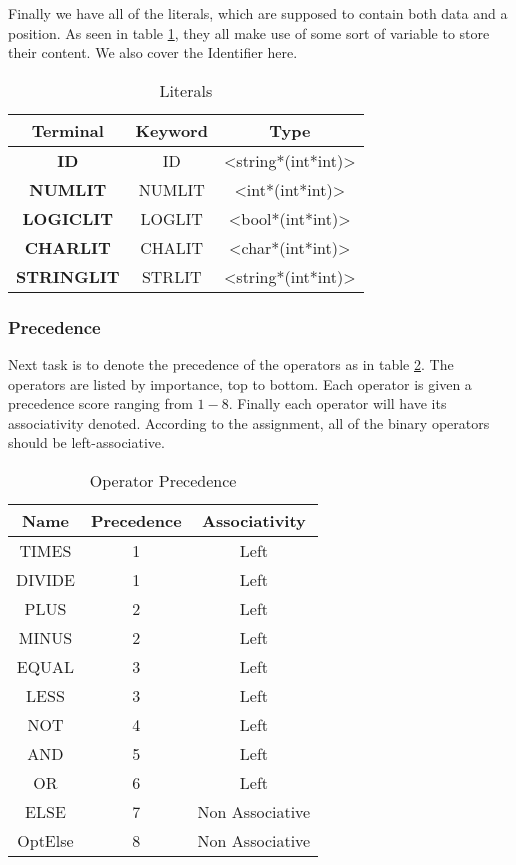 \documentclass[10pt]{article}
\begin{document}
Finally we have all of the literals, which are supposed to contain both data and a position. As seen in table \ref{tab:literals}, they all make use of some sort of variable to store their content. We also cover the Identifier here.

\begin{table}[!h]
\centering
\begin{tabular}{|c|c|c|}
\hline
Terminal & Keyword & Type\\
\hline
\textbf{ID} & ID & <string*(int*int)>\\
\textbf{NUMLIT} & NUMLIT & <int*(int*int)>\\
\textbf{LOGICLIT} & LOGLIT & <bool*(int*int)> \\
\textbf{CHARLIT} & CHALIT & <char*(int*int)> \\
\textbf{STRINGLIT} & STRLIT & <string*(int*int)> \\
\hline
\end{tabular}
\caption{\label{tab:literals}Literals}
\end{table}

\subsubsection{Precedence}
Next task is to denote the precedence of the operators as in table \ref{tab:op_precedence}. The operators are listed by importance, top to bottom. Each operator is given a precedence score ranging from \(1-8\). Finally each operator will have its associativity denoted. According to the assignment, all of the binary operators should be left-associative.

\begin{table}
\begin{center}
\begin{tabular}{|c|c|c|}
\hline
Name & Precedence & Associativity\\
\hline
TIMES & 1 & Left\\
DIVIDE & 1 & Left\\
PLUS & 2 & Left\\
MINUS & 2 & Left\\
EQUAL & 3 & Left\\
LESS & 3 & Left\\
NOT & 4 & Left\\
AND & 5 & Left\\
OR & 6 & Left\\
ELSE & 7 & Non Associative\\
OptElse & 8 & Non Associative\\
\hline
\end{tabular}
\end{center}
\caption{\label{tab:op_precedence}Operator Precedence}
\end{table}
\end{document}
